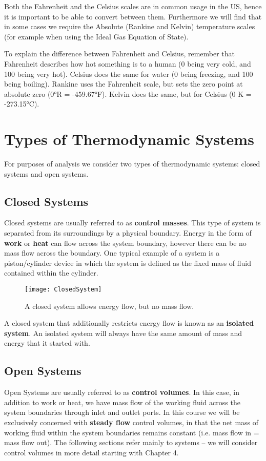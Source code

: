 Both the Fahrenheit and the Celsius scales are in common usage in the US, hence it is important to be able to convert between them. Furthermore we will find that in some cases we require the Absolute (Rankine and Kelvin) temperature scales (for example when using the Ideal Gas Equation of State).

To explain the difference between Fahrenheit and Celsius, remember that Fahrenheit describes how hot something is to a human (0 being very cold, and 100 being very hot).  Celsius does the same for water (0 being freezing, and 100 being boiling).  Rankine uses the Fahrenheit scale, but sets the zero point at absolute zero (0°R = -459.67°F).  Kelvin does the same, but for Celsius (0 K = -273.15°C).

\section{Types of Thermodynamic Systems}

For purposes of analysis we consider two types of thermodynamic systems: closed systems and open systems.

\subsection{Closed Systems}
Closed systems are usually referred to as {\bf control masses}. This type of system is separated from its surroundings by a physical boundary. Energy in the form of {\bf work} or {\bf heat} can flow across the system boundary, however there can be no mass flow across the boundary. One typical example of a system is a piston/cylinder device in which the system is defined as the fixed mass of fluid contained within the cylinder.

\begin{figure}[H]
\centering
\texttt{[image: ClosedSystem]}
\caption{A closed system allows energy flow, but no mass flow.}
\label{fig:ch1_closedSystem}
\end{figure}

A closed system that additionally restricts energy flow is known as an {\bf isolated system}.  An isolated system will always have the same amount of mass and energy that it started with.

\subsection{Open Systems}
Open Systems are usually referred to as {\bf control volumes}. In this case, in addition to work or heat, we have mass flow of the working fluid across the system boundaries through inlet and outlet ports. In this course we will be exclusively concerned with {\bf steady flow} control volumes, in that the net mass of working fluid within the system boundaries remains constant (i.e. mass flow in = mass flow out). The following sections refer mainly to systems – we will consider control volumes in more detail starting with Chapter 4.


